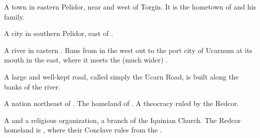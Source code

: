 \begin{gloss}
\begin{subgloss}
  
  
  
  
  \begin{comment}
  \subparagraph{\Redglen}
  \end{comment}
  \gitem{\Redglen}
  \index{\Redglen}
  A town in eastern Pelidor, near  and west of Torgin. 
  It is the hometown of  and his family. 
  
  
  
  
  
  \begin{comment}
  \subparagraph{Torgin}
  \end{comment}
  A city in southern Pelidor, east of \Redglen. 





  \begin{comment}
  \subparagraph{Ucarn}
  \end{comment}
  A river in eastern . 
  Runs from  in the west out to the port city of {Ucarnum} at its mouth in the east, where it meets the (much wider) . 
  
  A large and well-kept road, called simply the Ucarn Road, is built along the banks of the river. 
\end{subgloss}









\begin{comment}
\paragraph{\Redce}
\end{comment}
\gitem{\Redce}
\index{\Redce}
A nation northeast of \Velcad{}. 
The homeland of \ClanRedcor. 
A theocracy ruled by the Redcor. 







\begin{subgloss}
  \begin{comment}
  \subparagraph{Redcor}
  \end{comment}
  A \VaimonClan and a religious organization, a branch of the Iquinian Church. 
  The Redcor homeland is \Redce, where their Conclave rules from the \TopazChateau. 
  

\end{subgloss}
\end{gloss}
